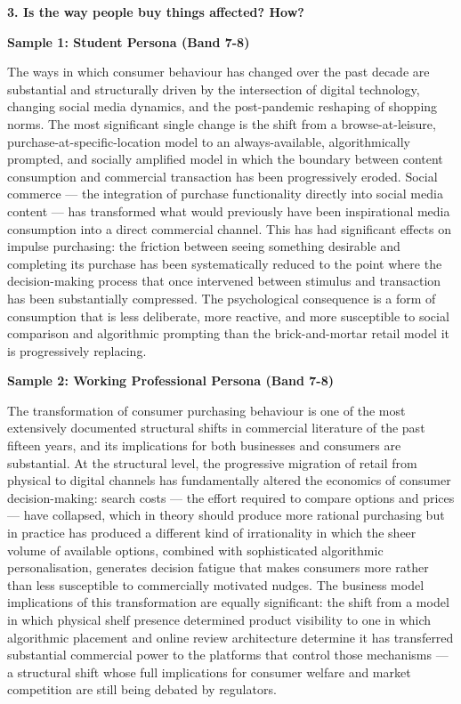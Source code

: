 \separator

\begin{ieltsquestion}
\textbf{3. Is the way people buy things affected? How?}
\end{ieltsquestion}
\textbf{Sample 1: Student Persona (Band 7-8)}

The ways in which consumer behaviour has changed over the past decade are substantial and structurally driven by the intersection of digital technology, changing social media dynamics, and the post-pandemic reshaping of shopping norms. The most significant single change is the shift from a browse-at-leisure, purchase-at-specific-location model to an always-available, algorithmically prompted, and socially amplified model in which the boundary between content consumption and commercial transaction has been progressively eroded. Social commerce — the integration of purchase functionality directly into social media content — has transformed what would previously have been inspirational media consumption into a direct commercial channel. This has had significant effects on impulse purchasing: the friction between seeing something desirable and completing its purchase has been systematically reduced to the point where the decision-making process that once intervened between stimulus and transaction has been substantially compressed. The psychological consequence is a form of consumption that is less deliberate, more reactive, and more susceptible to social comparison and algorithmic prompting than the brick-and-mortar retail model it is progressively replacing.

\textbf{Sample 2: Working Professional Persona (Band 7-8)}

The transformation of consumer purchasing behaviour is one of the most extensively documented structural shifts in commercial literature of the past fifteen years, and its implications for both businesses and consumers are substantial. At the structural level, the progressive migration of retail from physical to digital channels has fundamentally altered the economics of consumer decision-making: search costs — the effort required to compare options and prices — have collapsed, which in theory should produce more rational purchasing but in practice has produced a different kind of irrationality in which the sheer volume of available options, combined with sophisticated algorithmic personalisation, generates decision fatigue that makes consumers more rather than less susceptible to commercially motivated nudges. The business model implications of this transformation are equally significant: the shift from a model in which physical shelf presence determined product visibility to one in which algorithmic placement and online review architecture determine it has transferred substantial commercial power to the platforms that control those mechanisms — a structural shift whose full implications for consumer welfare and market competition are still being debated by regulators.

